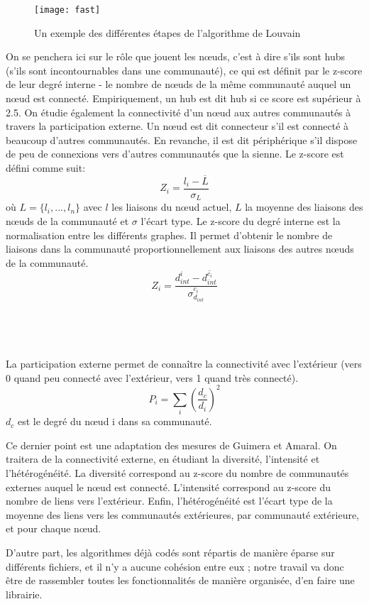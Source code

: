 \begin{titlepage}
{\begin{description}
\newpage
\begin{figure}[ht]
\centering
\texttt{[image: fast]}
\caption{Un exemple des différentes étapes de l'algorithme de Louvain}
\end{figure}
\item[Guimera et Amaral :]  On se penchera ici sur le rôle que jouent les nœuds, c'est à dire s'ils sont hubs (s'ils sont incontournables dans une communauté), ce qui est définit par le z-score de leur degré interne - le nombre de nœuds de la m\^eme communauté auquel un nœud est connecté. Empiriquement, un hub est dit hub si ce score est supérieur à 2.5. On étudie également la connectivité d'un nœud aux autres communautés à travers la participation externe. Un nœud est dit connecteur s'il est connecté à beaucoup d'autres communautés. En revanche, il est dit périphérique s'il dispose de peu de connexions vers d'autres communautés que la sienne. Le z-score est défini comme suit: \[Z_i=\frac{l_i-\overline{L}}{\sigma_L}\] où $L = \{l_i,...,l_n\} $ avec $l$ les liaisons du nœud actuel, $L$ la moyenne des liaisons des nœuds de la communauté et $\sigma$ l'écart type. Le z-score du degré interne est la normalisation entre les différents graphes. Il permet d'obtenir le nombre de liaisons dans la communauté proportionnellement aux liaisons des autres nœuds de la communauté.\\ \[Z_i=\frac{d_{int}^i - \overline{d_{int}^{c_i}}}{\sigma_{d_{int}}^{c_i}}\] \\ \\ \\ \\La participation externe permet de connaître la connectivité avec l'extérieur (vers 0 quand peu connecté avec l'extérieur, vers 1 quand très connecté). \[P_i=\sum_i\left(\frac{d_c}{d_i}\right)^2\] $d_c$ est le degré du nœud i dans sa communauté.\cite{GA}
\newline
\item[Dugué et Perez  :] Ce dernier point est une adaptation des mesures de Guimera et Amaral. On traitera de la connectivité externe, en étudiant la diversité, l'intensité et l'hétérogénéité. La diversité correspond au z-score du nombre de communautés externes auquel le nœud est connecté. L'intensité correspond au z-score du nombre de liens vers l'extérieur. Enfin, l'hétérogénéité est l'écart type de la moyenne des liens vers les communautés extérieures, par communauté extérieure, et pour chaque nœud. \cite{NDAP1}\cite{NDAP2}  \\ 
\end{description} 
D'autre part, les algorithmes déjà codés sont répartis de manière éparse sur différents fichiers, et il n'y a aucune cohésion entre eux ; notre travail va donc être de rassembler toutes les fonctionnalités de manière organisée, d'en faire une librairie.
}


\end{titlepage}
